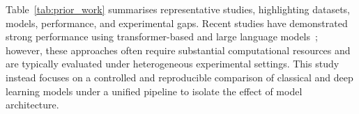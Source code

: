 Table~\ref{tab:prior_work} summarises representative studies, highlighting datasets, models, performance, and experimental gaps. Recent studies have demonstrated strong performance using transformer-based and large language models~\citep{rezapour2024emotion, almalki2025sentiment, khan2026hybrid}; however, these approaches often require substantial computational resources and are typically evaluated under heterogeneous experimental settings. This study instead focuses on a controlled and reproducible comparison of classical and deep learning models under a unified pipeline to isolate the effect of model architecture.

